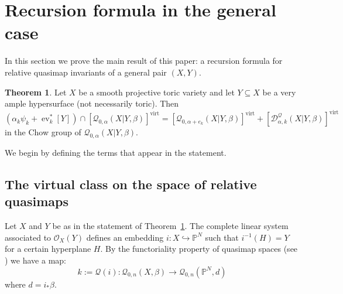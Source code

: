\documentclass[11pt]{amsart}
\newcommand{\Q}[4]{\mathcal{Q}_{#1,#2}(#3,#4)}
\newcommand{\PP}{\mathbb P}
\newcommand{\OO}{\mathcal{O}}
\renewcommand{\to}{\rightarrow}
\newcommand{\virt}[1]{[#1]^{\operatorname{virt}}}
\newcommand{\ev}{\operatorname{ev}}
\newcommand{\om}[1]{\mathcal{#1}}
\theoremstyle{definition}
\newtheorem{thm}{Theorem}[section]
\theoremstyle{definition}
\begin{document}
\section{Recursion formula in the general case}\label{Section recursion formula in general case}

In this section we prove the main result of this paper: a recursion formula for relative quasimap invariants of a general pair $(X,Y)$.  

\begin{thm} \label{Theorem general recursion} Let $X$ be a smooth projective toric variety and let $Y \subseteq X$ be a very ample hypersurface (not necessarily toric). Then
\begin{equation*} (\alpha_k \psi_k + \ev_k^* [Y]) \cap \virt{\Q{0}{\alpha}{X|Y}{\beta}} = \virt{\Q{0}{\alpha+e_k}{X|Y}{\beta}} + \virt{\mathcal D^\mathcal{Q}_{\alpha,k}(X|Y,\beta)} \end{equation*}
in the Chow group of $\Q{0}{\alpha}{X|Y}{\beta}$. 
\end{thm}

\noindent We begin by defining the terms that appear in the statement.

\subsection{The virtual class on the space of relative quasimaps}\label{Subsection virtual class in general} Let $X$ and $Y$ be as in the statement of Theorem~\ref{Theorem general recursion}.  The complete linear system associated to $\OO_X(Y)$ defines an embedding $i : X \hookrightarrow \PP^N$ such that $i^{-1}(H) = Y$ for a certain hyperplane $H$. By the functoriality property of quasimap spaces (see \cite[\S 3.1]{CF-K-wallcrossing}) we have a map:
\begin{equation*} k := \om{Q}(i) : \Q{0}{n}{X}{\beta} \to \Q{0}{n}{\PP^N}{d} \end{equation*}
where $d=i_*\beta$. %
\end{document}
